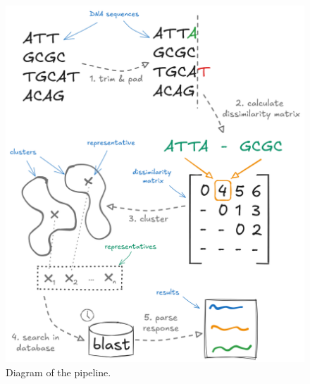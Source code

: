 \documentclass[pdflatex,sn-vancouver-num]{sn-jnl}%
\begin{document}
        \begin{figure}[!htb]
            \begin{center}
                \includegraphics[width=1.0\textwidth]{picture_pipeline.png}
            \end{center}
            \caption{
                Diagram of the pipeline.
            }\label{Picture:Pipeline}
        \end{figure}

\end{document}

